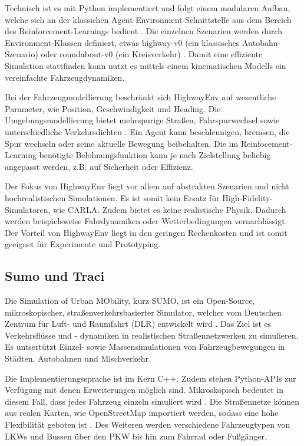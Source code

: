 Technisch ist es mit Python implementiert und folgt einem modularen Aufbau, welche sich an der klassichen Agent-Environment-Schnittstelle aus dem Bereich des Reinforcement-Learnings bedient \cite{highway-env}. Die einzelnen Szenarien werden durch Environment-Klassen definiert, etwas highway-v0 (ein klassisches Autobahn-Szenario) oder roundabout-v0 (ein Kreisverkehr) \cite{highway-env}. Damit eine effiziente Simulation stattfinden kann nutzt es mittels einem kinematischen Modells ein vereinfachte Fahrzeugdynamiken.

Bei der Fahrzeugmodellierung beschränkt sich HighwayEnv auf wesentliche Parameter, wie Position, Geschwindigkeit und Heading. Die Umgebungsmodellierung bietet mehrspurige Straßen, Fahrspurwechsel sowie unterschiedliche Verkehrsdichten \cite{highway-env}. Ein Agent kann beschleunigen, bremsen, die Spur wechseln oder seine aktuelle Bewegung beibehalten. Die im Reinfocement-Learning benötigte Belohnungsfunktion kann je nach Zielstellung beliebig angepasst werden, z.B. auf Sicherheit oder Effizienz. 

Der Fokus von HighwayEnv liegt vor allem auf abstrakten Szenarien und nicht hochrealistischen Simulationen. Es ist somit kein Ersatz für High-Fidelity-Simulatoren, wie CARLA. Zudem bietet es keine realistische Physik. Dadurch werden beispielsweise Fahrdynamiken oder Wetterbedingungen vernachlässigt. Der Vorteil von HighwayEnv liegt in den geringen Rechenkosten und ist somit geeignet für Experimente und Prototyping.
\subsection{Sumo und Traci}
Die Simulation of Urban MObility, kurz SUMO, ist ein Open-Source, mikroskopischer, straßenverkehrsbasierter Simulator, welcher vom Deutschen Zentrum für Luft- und Raumfahrt (DLR) entwickelt wird \cite{SUMO2018}. Das Ziel ist es Verkehrsflüsse und - dynamiken in realistischen Straßennetzwerken zu simulieren. Es untsertützt Einzel- sowie Massensimulationen von Fahrzeugbewegungen in Städten, Autobahnen und Mischverkehr.

Die Implementierungssprache ist im Kern C++. Zudem stehen Python-APIs zur Verfügung mit denen Erweiterungen möglich sind. Mikroskopisch bedeutet in diesem Fall, dass jedes Fahrzeug einzeln simuliert wird \cite{sumo_at_a_glance}. Die Straßennetze können aus realen Karten, wie OpenStreetMap importiert werden, sodass eine hohe Flexibilität geboten ist \cite{sumo_open_street_map}. Des Weiteren werden verschiedene Fahrzeugtypen von LKWs und Bussen über den PKW bis hin zum Fahrrad oder Fußgänger.

